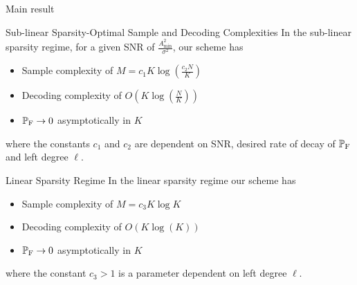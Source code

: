 \begin{frame}{Main result}

\begin{block}{Sub-linear Sparsity-Optimal Sample and Decoding Complexities}
In the sub-linear sparsity regime, for a given SNR of $\frac{A^{2}_{\text{min}}}{\sigma^{2}}$, our scheme has 
\begin{itemize}
\item Sample complexity of $M=c_1 K\log (\frac{c_2 N}{K})$
\item Decoding complexity of $O\left(K\log(\frac{N}{K})\right)$ 
\item $\mathbb{P}_{\text{F}}\rightarrow 0$ asymptotically in $K$
\end{itemize} 
where the constants $c_{1}$ and $c_{2}$ are dependent on SNR, desired rate of decay of $\mathbb{P}_{\text{F}}$ and left degree $\ell$.
\end{block}
\begin{block}{Linear Sparsity Regime}
In the linear sparsity regime our scheme has 
\begin{itemize}
\item Sample complexity of $M=c_3 K\log K$
\item Decoding complexity of $O\left(K\log(K)\right)$ 
\item $\mathbb{P}_{\text{F}}\rightarrow 0$ asymptotically in $K$
\end{itemize} 
where the constant $c_{3}>1$ is a parameter dependent on left degree $\ell$.
\end{block}
\end{frame}

